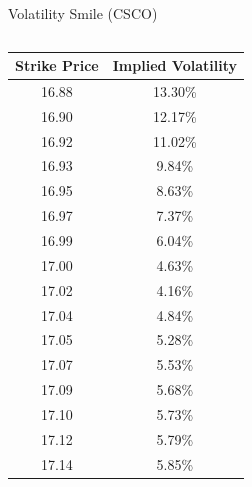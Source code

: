 \documentclass{beamer}
\begin{document}
\begin{frame}[shrink=50]{{\color{cyan}Volatility Smile ({\color{magenta}CSCO})}}
\bigskip
\begin{columns}

\begin{column}{0.3\textwidth}
\begin{table}[H]
\begin{center}
\begin{tabular}{cc}
\hline 
\textbf{Strike Price}	& \textbf{Implied Volatility}\\
\hline \hline
16.88	& 13.30\%\\
16.90	& 12.17\%\\
16.92	& 11.02\%\\
16.93	& 9.84\%\\
16.95	& 8.63\%\\
16.97	& 7.37\%\\
16.99	& 6.04\%\\
17.00	& 4.63\%\\
{\color{orange}17.02}	& 4.16\%\\
17.04	& 4.84\%\\
17.05	& 5.28\%\\
17.07	& 5.53\%\\
17.09	& 5.68\%\\
17.10	& 5.73\%\\
17.12	& 5.79\%\\
17.14	& 5.85\%\\
\hline 
\end{tabular}
\label{tab:CSCO_volatility_smile}
\end{center} 
\end{table} 
\end{column}


\end{columns}
\end{frame}
\end{document}
